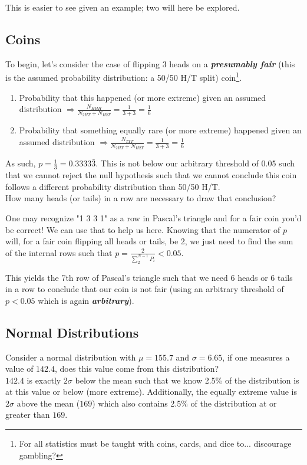 \documentclass[]{article}
\begin{document}
This is easier to see given an example; two will here be explored.

\subsection{Coins}
To begin, let's consider the case of flipping 3 heads on a \textbf{\textit{presumably fair}} (this is the assumed probability distribution: a 50/50 H/T split) coin\footnote{For all statistics must be taught with coins, cards, and dice to... discourage gambling?}.
\begin{enumerate}
	\item Probability that this happened (or more extreme) given an assumed distribution $\Rightarrow \frac{N_{HHH}}{N_{2HT} + N_{H2T}} = \frac{1}{3 + 3} = \frac{1}{6}$ 
	\item Probability that something equally rare (or more extreme) happened given an assumed distribution $\Rightarrow \frac{N_{TTT}}{N_{2HT} + N_{H2T}} = \frac{1}{3 + 3} = \frac{1}{6}$ 
\end{enumerate}
As such, $p = \frac{1}{3} = 0.3333\bar{3}$. This is not below our arbitrary threshold of 0.05 such that we cannot reject the null hypothesis such that we cannot conclude this coin follows a different probability distribution than 50/50 H/T.\\

How many heads (or tails) in a row are necessary to draw that conclusion?

One may recognize "1 3 3 1" as a row in Pascal's triangle and for a fair coin you'd be correct! We can use that to help us here.
Knowing that the numerator of $p$ will, for a fair coin flipping all heads or tails, be 2, we just need to find the sum of the internal rows such that $p = \frac{2}{\sum_2^{N - 1} P_i} < 0.05$. 

This yields the 7th row of Pascal's triangle such that we need 6 heads or 6 tails in a row to conclude that our coin is not fair (using an arbitrary threshold of $p < 0.05$ which is again \textbf{\textit{arbitrary}}).

\subsection{Normal Distributions}
Consider a normal distribution with $\mu = 155.7$ and $\sigma = 6.65$, if one measures a value of $142.4$, does this value come from this distribution?\\

$142.4$ is exactly $2\sigma$ below the mean such that we know 2.5\% of the distribution is at this value or below (more extreme). Additionally, the equally extreme value is $2\sigma$ above the mean ($169$) which also contains 2.5\% of the distribution at or greater than $169$. 
\end{document}

